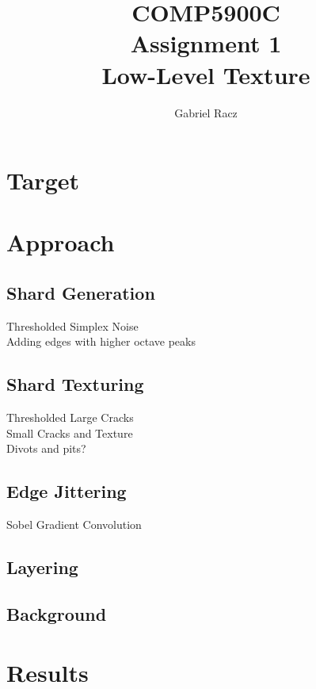 \documentclass[a4paper, 11pt, titlepage]{article}
\title{COMP5900C\\
Assignment 1\\
Low-Level Texture}
\author{Gabriel Racz}
\begin{document}
\maketitle
\section{Target}
\section{Approach}
\subsection{Shard Generation}
Thresholded Simplex Noise \\
Adding edges with higher octave peaks
\subsection{Shard Texturing}
Thresholded Large Cracks \\
Small Cracks and Texture \\
Divots and pits?
\subsection{Edge Jittering}
Sobel Gradient Convolution
\subsection{Layering}
\subsection{Background}
\section{Results}

\pagebreak
\end{document}
